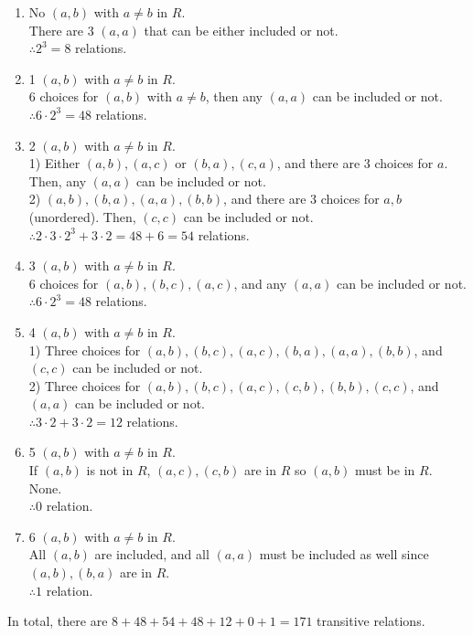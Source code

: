 \documentclass[12pt, oneside]{article}
\begin{document}
\begin{enumerate}
\item No $(a, b)$ with $a \neq b$ in $R$.\\
There are 3 $(a, a)$ that can be either included or not.\\
$\therefore 2^3=8$ relations.\\
\item 1 $(a, b)$ with $a \neq b$ in $R$.\\
6 choices for $(a, b)$ with $a \neq b$, then any $(a, a)$ can be included or not.\\
$\therefore 6 \cdot 2^3 = 48$ relations.\\
\item 2 $(a, b)$ with $a \neq b$ in $R$.\\
1) Either $(a, b), (a, c)$ or $(b, a), (c, a)$, and there are 3 choices for $a$. Then, any $(a, a)$ can be included or not.\\
2) $(a, b), (b, a), (a, a), (b, b)$, and there are 3 choices for $a, b$ (unordered). Then, $(c, c)$ can be included or not.\\
$\therefore 2 \cdot 3 \cdot 2^3 + 3 \cdot 2= 48 + 6 = 54$ relations.\\
\item 3 $(a, b)$ with $a \neq b$ in $R$.\\
6 choices for $(a, b), (b, c), (a, c)$, and any $(a, a)$ can be included or not.\\
$\therefore 6 \cdot 2^3 = 48$ relations.\\
\item 4 $(a, b)$ with $a \neq b$ in $R$.\\
1) Three choices for $(a, b), (b, c), (a, c), (b, a), (a, a), (b, b)$, and $(c, c)$ can be included or not.\\
2) Three choices for $(a, b), (b, c), (a, c), (c, b), (b, b), (c, c)$, and $(a, a)$ can be included or not.\\
$\therefore 3 \cdot 2 + 3 \cdot 2 = 12$ relations.\\
\item 5 $(a, b)$ with $a \neq b$ in $R$.\\
If $(a, b)$ is not in $R$, $(a, c), (c, b)$ are in $R$ so $(a, b)$ must be in $R$. None.\\
$\therefore 0$ relation.\\
\item 6 $(a, b)$ with $a \neq b$ in $R$.\\
All $(a, b)$ are included, and all $(a, a)$ must be included as well since $(a, b), (b, a)$ are in $R$.\\
$\therefore 1$ relation.\\
\end{enumerate}
In total, there are $8 + 48 + 54 + 48 + 12 + 0 + 1 = 171$ transitive relations.
\end{document}

